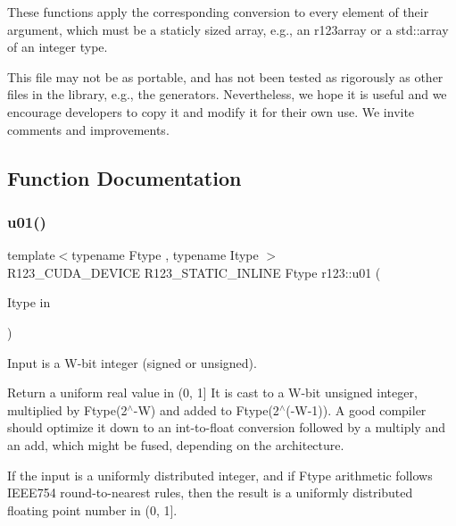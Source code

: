 These functions apply the corresponding conversion to every element of their argument, which must be a staticly sized array, e.\+g., an r123array or a std\+::array of an integer type.

This file may not be as portable, and has not been tested as rigorously as other files in the library, e.\+g., the generators. Nevertheless, we hope it is useful and we encourage developers to copy it and modify it for their own use. We invite comments and improvements. 

\subsection{Function Documentation}
\hypertarget{group__uniform_gafc96ad616364743e209c836450cc4107}{}\label{group__uniform_gafc96ad616364743e209c836450cc4107} 
\subsubsection{\texorpdfstring{u01()}{u01()}}
{\footnotesize\ttfamily template$<$typename Ftype , typename Itype $>$ \\
R123\+\_\+\+C\+U\+D\+A\+\_\+\+D\+E\+V\+I\+CE R123\+\_\+\+S\+T\+A\+T\+I\+C\+\_\+\+I\+N\+L\+I\+NE Ftype r123\+::u01 (\begin{DoxyParamCaption}\item[{Itype}]{in }\end{DoxyParamCaption})}



Input is a W-\/bit integer (signed or unsigned). 

Return a uniform real value in (0, 1\mbox{]} It is cast to a W-\/bit unsigned integer, multiplied by Ftype(2$^\wedge$-\/W) and added to Ftype(2$^\wedge$(-\/\+W-\/1)). A good compiler should optimize it down to an int-\/to-\/float conversion followed by a multiply and an add, which might be fused, depending on the architecture.

If the input is a uniformly distributed integer, and if Ftype arithmetic follows I\+E\+E\+E754 round-\/to-\/nearest rules, then the result is a uniformly distributed floating point number in (0, 1\mbox{]}.



